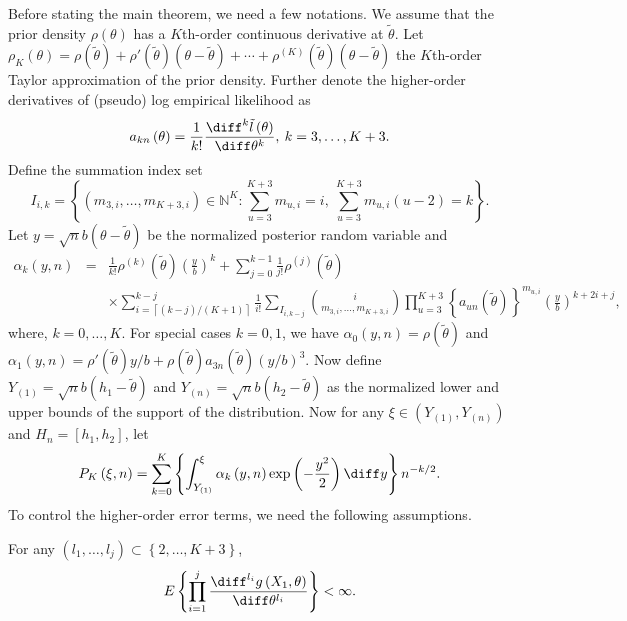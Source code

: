 Before stating the main theorem, we need a few notations. We assume that the
prior density $\rho\left(\theta\right)$ has a $K$th-order continuous derivative
at $\tilde{\theta}$. Let $\rho_{K}\left(\theta\right)=\rho\left(\tilde{\theta}\right)+\rho'\left(\tilde{\theta}\right)\left(\theta-\tilde{\theta}\right)+\cdots+\rho^{\left(K\right)}\left(\tilde{\theta}\right)\left(\theta-\tilde{\theta}\right)$ the $K$th-order  Taylor approximation of the prior density.
Further denote the higher-order derivatives of (pseudo) log empirical
likelihood as 
\[
a_{kn}\left(\theta\right)=\frac{1}{k!}\frac{\diff^{k}\tilde{l}\left(\theta\right)}{\diff\theta^{k}},\: k=3,\ldots,K+3.
\]
 Define the summation index set 
\[
I_{i,k}=\left\{ \left(m_{3,i},\ldots,m_{K+3,i}\right)\in\mathbb{N}^{K}:\sum_{u=3}^{K+3}m_{u,i}=i,\:\sum_{u=3}^{K+3}m_{u,i}\left(u-2\right)=k\right\} .
\]
 Let $y=\sqrt{n}b\left(\theta-\tilde{\theta}\right)$ be the normalized posterior random variable and 
\begin{eqnarray*}
\alpha_{k}\left(y,n\right) & = & \frac{1}{k!}\rho^{\left(k\right)}\left(\tilde{\theta}\right)\left(\frac{y}{b}\right)^{k}+\sum_{j=0}^{k-1}\frac{1}{j!}\rho^{\left(j\right)}\left(\tilde{\theta}\right)\\
 &  & \times\sum_{i=\left\lceil \left(k-j\right)/\left(K+1\right)\right\rceil }^{k-j}\frac{1}{i!}\sum_{I_{i,k-j}}\binom{i}{m_{3,i},\ldots,m_{K+3,i}}\prod_{u=3}^{K+3}\left\{ a_{un}\left(\tilde{\theta}\right)\right\} ^{m_{u,i}}\left(\frac{y}{b}\right)^{k+2i+j},
\end{eqnarray*}
where, $k=0,\ldots,K$. For special cases $k=0,1$, we have $\alpha_{0}\left(y,n\right)=\rho\left(\tilde{\theta}\right)$
and $\alpha_{1}\left(y,n\right)=\rho'\left(\tilde{\theta}\right)y/b+\rho\left(\tilde{\theta}\right)a_{3n}\left(\tilde{\theta}\right)\left(y/b\right)^{3}.$
Now define $Y_{\left(1\right)}=\sqrt{n}b\left(h_{1}-\tilde{\theta}\right)$
and $Y_{\left(n\right)}=\sqrt{n}b\left(h_{2}-\tilde{\theta}\right)$  as  the normalized lower and upper bounds of the support of the  distribution. Now for any $\xi\in\left(Y_{\left(1\right)},Y_{\left(n\right)}\right)$ 
and $H_n=\left[h_{1},h_{2}\right]$, {let }
\[
P_{K}\left(\xi,n\right)=\sum_{k=0}^{K}\left\{ \int_{Y_{\left(1\right)}}^{\xi}\alpha_{k}\left(y,n\right)\exp\left(-\frac{y^{2}}{2}\right)\diff y\right\} n^{-k/2}.
\]
To control the higher-order error terms, we need the following assumptions.
\begin{assumption}
\label{ass:higher-order-moment-deriv-g}
For any $\left(l_1,\ldots,l_j\right)\subset\left\{2,\ldots,K+3\right\}$,
\[
	E\left\{\prod_{i=1}^j \frac{\diff^{l_i} g\left(X_1,\theta\right)}{\diff \theta^{l_i}}\right\} < \infty.
\]
\end{assumption}
